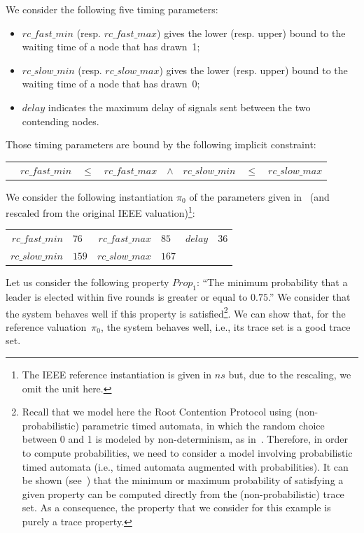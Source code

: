 \documentclass[a4paper,10pt]{article}
\newcommand{\nanos}{ns}
\newcommand{\rcpFMax}{\mathit{rc\_fast\_max}}
\newcommand{\rcpFMin}{\mathit{rc\_fast\_min}}
\newcommand{\rcpSMax}{\mathit{rc\_slow\_max}}
\newcommand{\rcpSMin}{\mathit{rc\_slow\_min}}
\newcommand{\rcpD}{\mathit{delay}}
\begin{document}
We consider the following five timing parameters:
\begin{itemize}
	\item $\rcpFMin$ (resp. $\rcpFMax$) gives the lower (resp. upper) bound to the waiting time of a node that has drawn~1;
	\item $\rcpSMin$ (resp. $\rcpSMax$) gives the lower (resp. upper) bound to the waiting time of a node that has drawn~0;
	\item $\rcpD$ indicates the maximum delay of signals sent between the two contending nodes.
\end{itemize}
Those timing parameters are bound by the following implicit constraint:

\smallskip
{\centering

\begin{tabular}{c r @{\ } c @{\ } l @{\ \ \ \ \ \ } c r @{\ } c @{\ } l}
        & $\rcpFMin$ & $ \leq $ & $\rcpFMax$ &
$\land$ & $\rcpSMin$ & $ \leq $ & $\rcpSMax$ \\
\end{tabular}

}
\medskip

We consider the following instantiation $\pi_0$ of the parameters given in~\cite{kns03} (and rescaled from the original IEEE valuation)\footnote{The IEEE reference instantiation is given in $\nanos$ but, due to the rescaling, we omit the unit here.}:

\smallskip
{\centering

\begin{tabular}{r @{\ =\ } l @{\ \ \ \ \ \ } r @{\ =\ } l @{\ \ \ \ \ \ } r @{\ =\ } l}
$\rcpFMin$ & $76 $ &
$\rcpFMax$ & $85 $ &
$\rcpD$ & $36$ \\
$\rcpSMin$ & $159 $ &
$\rcpSMax$ & $167 $ \\
\end{tabular}

}
\medskip


Let us consider the following property $\mathit{Prop}_1$: ``The minimum probability that a leader is elected within five rounds is greater or equal to $0.75$.''
We consider that the system behaves well if this property is satisfied\footnote{Recall that we model here the Root Contention Protocol using (non-probabilistic) parametric timed automata, in which the random choice between 0 and 1 is modeled by non-determinism, as in~\cite{hrsv02}.
Therefore, in order to compute probabilities, we need to consider a model involving probabilistic timed automata (i.e., timed automata augmented with probabilities).
It can be shown (see~\cite{afs09}) that the minimum or maximum probability of satisfying a given property can be computed directly from the (non-probabilistic) trace set.
As a consequence, the property that we consider for this example is purely a trace property.
}.
We can show that, for the reference valuation~$\pi_0$, the system behaves well, i.e., its trace set is a good trace set.
\end{document}
